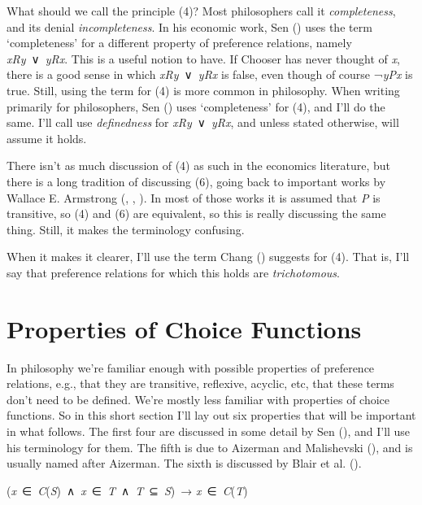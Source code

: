 \documentclass[
  11pt,
  letterpaper,
  DIV=11,
  numbers=noendperiod,
  twoside]{scrartcl}
\providecommand{\tightlist}{%
  \setlength{\itemsep}{0pt}\setlength{\parskip}{0pt}}
\begin{document}
What should we call the principle (4)? Most philosophers call it
\emph{completeness}, and its denial \emph{incompleteness}. In his
economic work, Sen () uses the
term `completeness' for a different property of preference relations,
namely \emph{xRy}~∨~\emph{yRx}. This is a useful notion to have. If
Chooser has never thought of \emph{x}, there is a good sense in which
\emph{xRy}~∨~\emph{yRx} is false, even though of course ¬\emph{yPx} is
true. Still, using the term for (4) is more common in philosophy. When
writing primarily for philosophers, Sen ()
uses `completeness' for (4), and I'll do the same. I'll call use
\emph{definedness} for \emph{xRy}~∨~\emph{yRx}, and unless stated
otherwise, will assume it holds.

There isn't as much discussion of (4) as such in the economics
literature, but there is a long tradition of discussing (6), going back
to important works by Wallace E. Armstrong
(, ,
). In most of those works it is
assumed that \emph{P} is transitive, so (4) and (6) are equivalent, so
this is really discussing the same thing. Still, it makes the
terminology confusing.

When it makes it clearer, I'll use the term Chang
() suggests for (4). That is, I'll say
that preference relations for which this holds are \emph{trichotomous}.

\section{Properties of Choice Functions}\label{sec-properties}

In philosophy we're familiar enough with possible properties of
preference relations, e.g., that they are transitive, reflexive,
acyclic, etc, that these terms don't need to be defined. We're mostly
less familiar with properties of choice functions. So in this short
section I'll lay out six properties that will be important in what
follows. The first four are discussed in some detail by Sen
(), and I'll use his
terminology for them. The fifth is due to Aizerman and Malishevski
(), and is usually named after
Aizerman. The sixth is discussed by Blair et al.
().

\begin{description}
\tightlist
\item[Property α]
(\emph{x}~∈~\emph{C}(\emph{S})~∧~\emph{x}~∈~\emph{T}~∧~\emph{T}~⊆~\emph{S})~→
\emph{x}~∈~\emph{C}(\emph{T})
\end{description}
\end{document}
